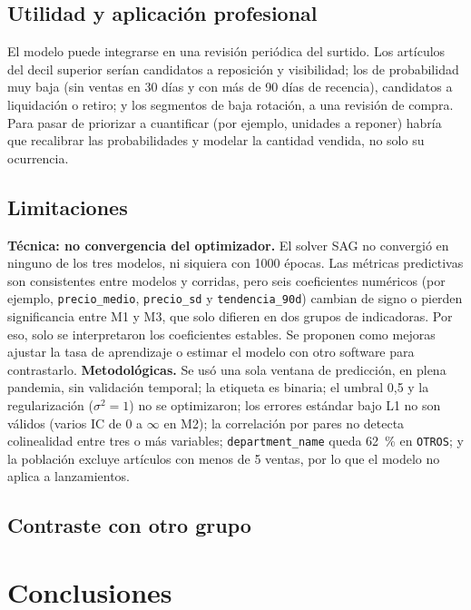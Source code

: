 \documentclass[
  journal=largetwo,
  manuscript=Laboratorio-Numero-02,
  year=2026,
  volume=1
]{cup-journal}
\begin{document}
\subsection{Utilidad y aplicación profesional}

El modelo puede integrarse en una revisión periódica del surtido. Los artículos del decil superior serían candidatos a reposición y visibilidad; los de probabilidad muy baja (sin ventas en 30 días y con más de 90 días de recencia), candidatos a liquidación o retiro; y los segmentos de baja rotación, a una revisión de compra. Para pasar de priorizar a cuantificar (por ejemplo, unidades a reponer) habría que recalibrar las probabilidades \autocite{niculescu2005calibration} y modelar la cantidad vendida, no solo su ocurrencia.

\subsection{Limitaciones}

\textbf{Técnica: no convergencia del optimizador.} El solver SAG no convergió en ninguno de los tres modelos, ni siquiera con 1000 épocas. Las métricas predictivas son consistentes entre modelos y corridas, pero seis coeficientes numéricos (por ejemplo, \texttt{precio\_medio}, \texttt{precio\_sd} y \texttt{tendencia\_90d}) cambian de signo o pierden significancia entre M1 y M3, que solo difieren en dos grupos de indicadoras. Por eso, solo se interpretaron los coeficientes estables. Se proponen como mejoras ajustar la tasa de aprendizaje o estimar el modelo con otro software para contrastarlo.
\textbf{Metodológicas.} Se usó una sola ventana de predicción, en plena pandemia, sin validación temporal; la etiqueta es binaria; el umbral 0,5 y la regularización ($\sigma^2=1$) no se optimizaron; los errores estándar bajo L1 no son válidos (varios IC de 0 a $\infty$ en M2); la correlación por pares no detecta colinealidad entre tres o más variables; \texttt{department\_name} queda 62~\% en \texttt{OTROS}; y la población excluye artículos con menos de 5 ventas, por lo que el modelo no aplica a lanzamientos.

\subsection{Contraste con otro grupo}

\section{Conclusiones}
\end{document}
